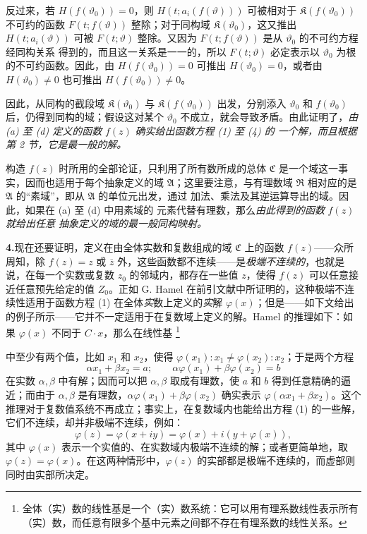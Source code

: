 \documentclass[11pt]{article}
\providecommand{\qtext}[1]{“#1”}
\providecommand{\Afield}{\mathfrak A}
\providecommand{\Cfield}{\mathfrak C}
\providecommand{\Kfield}{\mathfrak K}
\providecommand{\Rfield}{\mathfrak R}
\providecommand{\srcfn}[2]{%
  \begingroup\renewcommand{\thefootnote}{#1}\footnote{#2}\addtocounter{footnote}{-1}\endgroup}
\begin{document}
反过来，若 \(H(f(\vartheta_0))=0\)，则
\(H(t;a_i(f(\vartheta)))\) 可被相对于
\(\Kfield(f(\vartheta_0))\) 不可约的函数
\(F(t;f(\vartheta))\) 整除；对于同构域
\(\Kfield(\vartheta_0)\)，这又推出
\(H(t;a_i(\vartheta))\) 可被 \(F(t;\vartheta)\) 整除。又因为
\(F(t;f(\vartheta))\) 是从 \(\vartheta_0\) 的不可约方程经同构关系
得到的，而且这一关系是一一的，所以 \(F(t;\vartheta)\) 必定表示以
\(\vartheta_0\) 为根的不可约函数。因此，由
\(H(f(\vartheta_0))=0\) 可推出 \(H(\vartheta_0)=0\)，或者由
\(H(\vartheta_0)\ne0\) 也可推出 \(H(f(\vartheta_0))\ne0\)。

因此，从同构的截段域 \(\Kfield(\vartheta_0)\) 与
\(\Kfield(f(\vartheta_0))\) 出发，分别添入 \(\vartheta_0\) 和
\(f(\vartheta_0)\) 后，仍得到同构的域；假设这对某个
\(\vartheta_0\) 不成立，就会导致矛盾。由此证明了，\emph{由 (a) 至
(d) 定义的函数} \(f(z)\) \emph{确实给出函数方程 (1) 至 (4) 的
一个解，而且根据第 2 节，它是最一般的解。}

构造 \(f(z)\) 时所用的全部论证，只利用了所有数所成的总体
\(\Cfield\) 是一个域这一事实，因而也适用于每个抽象定义的域
\(\Afield\)；这里要注意，与有理数域 \(\Rfield\) 相对应的是
\(\Afield\) 的\qtext{素域}，即从 \(\Afield\) 的单位元出发，通过
加法、乘法及其逆运算导出的域。因此，如果在 (a) 至 (d) 中用素域的
元素代替有理数，那么\emph{由此得到的函数} \(f(z)\) \emph{就给出任意
抽象定义的域的最一般同构映射。}

\medskip

\noindent\textbf{4.}\quad 现在还要证明，定义在由全体实数和复数组成的域 \(\Cfield\) 上的函数 \(f(z)\)——众所周知，除 \(f(z)=z\) 或 \(\overline z\) 外，这些函数都不连续——是\emph{极端不连续的}，也就是说，在每一个实数或复数 \(z_0\) 的邻域内，都存在一些值 \(z\)，使得 \(f(z)\) 可以任意接近任意预先给定的值 \(Z_0\)。正如 G. Hamel 在前引文献中所证明的，这种极端不连续性适用于函数方程 (1) 在全体\emph{实}数上定义的\emph{实}解 \(\varphi(x)\)；但是——如下文给出的例子所示——它并不一定适用于在复数域上定义的解。Hamel 的推理如下：如果 \(\varphi(x)\) 不同于 \(C\cdot x\)，那么在线性基\srcfn{*)}{全体（实）数的线性基是一个（实）数系统：它可以用有理系数线性表示所有（实）数，而任意有限多个基中元素之间都不存在有理系数的线性关系。}中至少有两个值，比如 \(x_1\) 和 \(x_2\)，使得 \(\varphi(x_1):x_1\ne\varphi(x_2):x_2\)；于是两个方程
\[
\alpha x_1+\beta x_2=a;\qquad \alpha\varphi(x_1)+\beta\varphi(x_2)=b
\]
在实数 \(\alpha,\beta\) 中有解；因而可以把 \(\alpha,\beta\) 取成有理数，使 \(a\) 和 \(b\) 得到任意精确的逼近；而由于 \(\alpha,\beta\) 是有理数，\(\alpha\varphi(x_1)+\beta\varphi(x_2)\) 确实表示 \(\varphi(\alpha x_1+\beta x_2)\)。这个推理对于复数值系统不再成立；事实上，在复数域内也能给出方程 (1) 的一些解，它们不连续，却并非极端不连续，例如：
\[
\varphi(z)=\varphi(x+iy)=\varphi(x)+i(y+\varphi(x)),
\]
其中 \(\varphi(x)\) 表示一个实值的、在实数域内极端不连续的解；或者更简单地，取 \(\varphi(z)=\varphi(x)\)。在这两种情形中，\(\varphi(z)\) 的实部都是极端不连续的，而虚部则同时由实部所决定。
\end{document}
